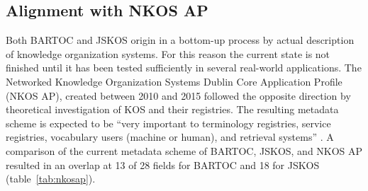 \documentclass[12pt,a4paper]{llncs}
\begin{document}
\subsection{Alignment with NKOS AP}

Both BARTOC and JSKOS origin in a bottom-up process by actual description of knowledge organization systems. For this reason the current state is not finished until it has been tested sufficiently in several real-world applications. The Networked Knowledge Organization Systems Dublin Core Application Profile (NKOS AP), created between 2010 and 2015 followed the opposite direction by theoretical investigation of KOS and their registries. The resulting metadata scheme is expected to be ``very important to terminology registries, service registries, vocabulary users (machine or human), and retrieval systems'' \cite{zeng2015nkos}. 
A comparison of the current metadata scheme of BARTOC, JSKOS, and NKOS AP resulted in an overlap at 13 of 28 fields for BARTOC and 18 for JSKOS (table~\ref{tab:nkosap}).
\end{document}
